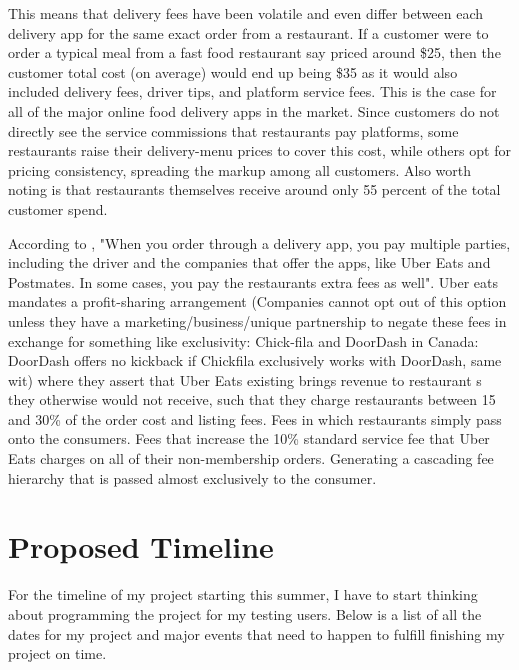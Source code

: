 \documentclass[10pt,twocolumn]{article}
\begin{document}
This means that delivery fees have been volatile and even differ between each delivery app for the same exact order from a restaurant. If a customer were to order a typical meal from a fast food restaurant say priced around \$25, then the customer total cost (on average) would end up being \$35 as it would also included delivery fees, driver tips, and platform service fees. This is the case for all of the major online food delivery apps in the market. Since customers do not directly see the service commissions that restaurants pay platforms, some restaurants raise their delivery-menu prices to cover this cost, while others opt for pricing consistency, spreading the markup among all customers. Also worth noting is that restaurants themselves receive around only 55 percent of the total customer spend.

According to , "When you order through a delivery app, you pay multiple parties, including the driver and the companies that offer the apps, like Uber Eats and Postmates. In some cases, you pay the restaurants extra fees as well".
Uber eats mandates a profit-sharing arrangement (Companies cannot opt out of this option unless they have a marketing/business/unique partnership to negate these fees in exchange for something like exclusivity: Chick-fila and DoorDash in Canada: DoorDash offers no kickback if Chickfila exclusively works with DoorDash, same wit) where they assert that Uber Eats existing brings revenue to restaurant s they otherwise would not receive, such that they charge restaurants between 15 and 30\% of the order cost and listing fees. Fees in which restaurants simply pass onto the consumers. Fees that increase the 10\% standard service fee that Uber Eats charges on all of their non-membership orders. Generating a cascading fee hierarchy that is passed almost exclusively to the consumer. 

\section{Proposed Timeline}
For the timeline of my project starting this summer, I have to start thinking about programming the project for my testing users. Below is a list of all the dates for my project and major events that need to happen to fulfill finishing my project on time. 
\end{document}
